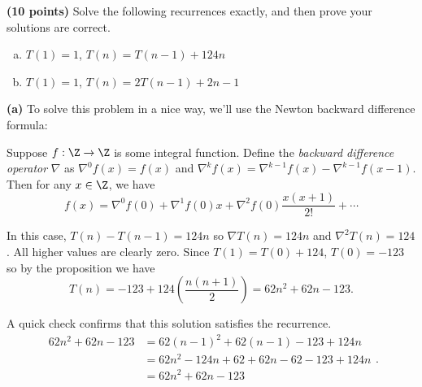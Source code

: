 \documentclass[11pt, letterpaper]{article}
\begin{document}
\pagebreak
\begin{problem} {\bf (10 points)}
    Solve the following recurrences exactly, and then prove your solutions are correct.
    \begin{enumerate}[(a)]
        \item $T(1)=1$, $T(n)=T(n-1) + 124n$
        \item $T(1)=1$, $T(n)=2T(n-1) + 2n-1$ 
    \end{enumerate}    
\end{problem}

\begin{solution}
    \textbf{(a)} To solve this problem in a nice way, we'll use the Newton backward difference formula:
    \begin{proposition*}
       Suppose $f : \Z \to \Z$ is some integral function. Define the \emph{backward difference operator} $\nabla$ as $\nabla^0f(x)=f(x)$ and $\nabla^kf(x)=\nabla^{k-1}f(x)-\nabla^{k-1}f(x-1)$. Then for any $x\in \Z$, we have 
       \[
         f(x)=\nabla^0f(0)+\nabla^1f(0)x+\nabla^2f(0)\frac{x(x+1)}{2!}+\cdots
        \]   
    \end{proposition*}
    In this case, $T(n)-T(n-1)=124n$ so $\nabla T(n)=124n$ and $\nabla^2 T(n)=124$. All higher values are clearly zero. Since $T(1)=T(0)+124$, $T(0)=-123$ so by the proposition we have 
    \[
        T(n)=-123+124\left(\frac{n(n+1)}{2}\right) = 62n^2 + 62n - 123.
    \]
    
    A quick check confirms that this solution satisfies the recurrence.
    \[
      \begin{aligned}
          62n^2+62n-123&=62(n-1)^2+62(n-1)-123 + 124n\\
          &=62n^2-124n+62+62n-62-123 + 124n\\
          &=62n^2+62n-123\\
      \end{aligned}
    .\] 
   

\end{solution}
\end{document}
